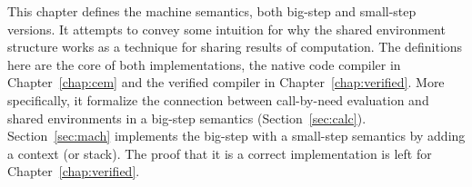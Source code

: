 This chapter defines the \ce machine semantics, both big-step and small-step
versions. It attempts to convey some intuition for why the shared environment
structure works as a technique for sharing results of computation. The
definitions here are the core of both implementations, the native code compiler
in Chapter~\ref{chap:cem} and the verified compiler in
Chapter~\ref{chap:verified}. More specifically, it formalize the connection
between call-by-need evaluation and shared environments in a big-step semantics
(Section~\ref{sec:calc}).  Section~\ref{sec:mach} implements the big-step with a
small-step semantics by adding a context (or stack). The proof that it is a
correct implementation is left for Chapter~\ref{chap:verified}.
